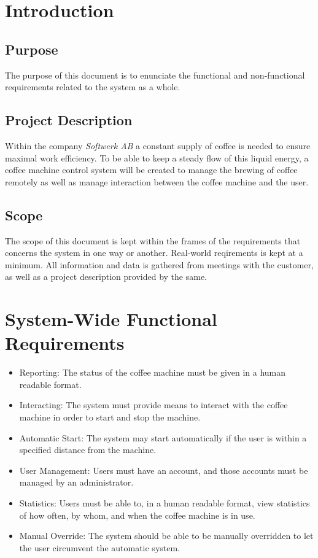 \section{Introduction}

\subsection{Purpose}

The purpose of this document is to enunciate the functional and non-functional
requirements related to the system as a whole.


\subsection{Project Description}

Within the company \textit{Softwerk AB} a constant supply of coffee is needed to ensure maximal work efficiency. To be able to keep a steady flow of this liquid energy, a coffee machine control system will be created to manage the brewing of coffee remotely as well as manage interaction between the coffee machine and the user.


\subsection{Scope}

The scope of this document is kept within the frames of the requirements that concerns the system in one way or another. Real-world reqirements is kept at a minimum. All information and data is gathered from meetings with the customer, as well as a project description provided by the same.

\section{System-Wide Functional Requirements}

\begin{itemize}
\item Reporting: The status of the coffee machine must be given in a
human readable format.
\item Interacting: The system must provide means to interact with the
coffee machine in order to start and stop the machine.
\item Automatic Start: The system may start automatically if the user is
within a specified distance from the machine.
\item User Management: Users must have an account, and those accounts
must be managed by an administrator.
\item Statistics: Users must be able to, in a human readable format, view statistics of how often, by whom, and when the coffee machine is in use.
\item Manual Override: The system should be able to be manually overridden
to let the user circumvent the automatic system.
\end{itemize}

